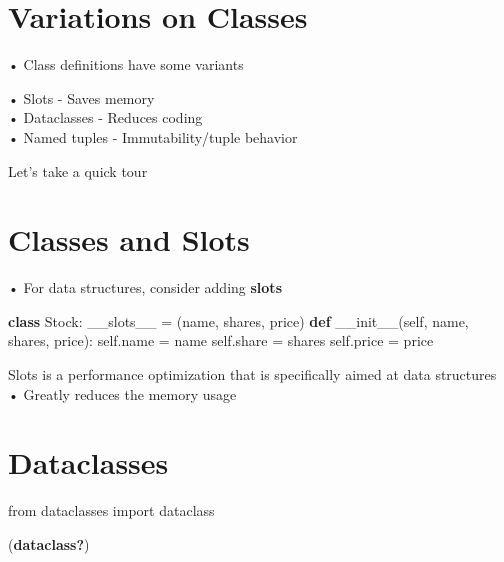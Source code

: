 \documentclass[
  letterpaper,
  DIV=11,
  numbers=noendperiod]{scrreprt}
\newenvironment{Shaded}{\begin{snugshade}}{\end{snugshade}}
\newcommand{\FunctionTok}[1]{\textcolor[rgb]{0.28,0.35,0.67}{#1}}
\newcommand{\KeywordTok}[1]{\textcolor[rgb]{0.00,0.23,0.31}{\textbf{#1}}}
\newcommand{\NormalTok}[1]{\textcolor[rgb]{0.00,0.23,0.31}{#1}}
\newcommand{\OperatorTok}[1]{\textcolor[rgb]{0.37,0.37,0.37}{#1}}
\newcommand{\StringTok}[1]{\textcolor[rgb]{0.13,0.47,0.30}{#1}}
\newcommand{\VariableTok}[1]{\textcolor[rgb]{0.07,0.07,0.07}{#1}}
\begin{document}

\chapter{Variations on Classes}\label{variations-on-classes}

• Class definitions have some variants

• Slots - Saves memory\\
• Dataclasses - Reduces coding\\
• Named tuples - Immutability/tuple behavior

Let's take a quick tour


\chapter{Classes and Slots}\label{classes-and-slots}

• For data structures, consider adding \textbf{slots}

\begin{Shaded}
\begin{Highlighting}[]
\KeywordTok{class}\NormalTok{ Stock: }\VariableTok{\_\_slots\_\_} \OperatorTok{=}\NormalTok{ (}\StringTok{\textquotesingle{}name\textquotesingle{}}\NormalTok{, }\StringTok{\textquotesingle{}shares\textquotesingle{}}\NormalTok{, }\StringTok{\textquotesingle{}price\textquotesingle{}}\NormalTok{) }\KeywordTok{def} \FunctionTok{\_\_init\_\_}\NormalTok{(}\VariableTok{self}\NormalTok{, name, shares, price): }\VariableTok{self}\NormalTok{.name }\OperatorTok{=}\NormalTok{ name }\VariableTok{self}\NormalTok{.share }\OperatorTok{=}\NormalTok{ shares }\VariableTok{self}\NormalTok{.price }\OperatorTok{=}\NormalTok{ price }
\end{Highlighting}
\end{Shaded}

Slots is a performance optimization that is specifically aimed at data
structures\\
• Greatly reduces the memory usage


\chapter{Dataclasses}\label{dataclasses}

from dataclasses import dataclass

(\textbf{dataclass?})
\end{document}
